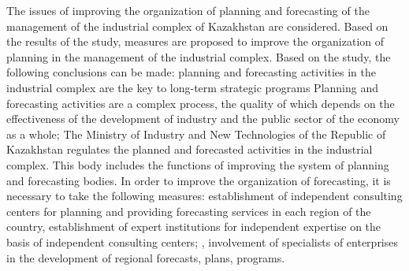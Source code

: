 The issues of improving the organization of planning and forecasting of
the management of the industrial complex of Kazakhstan are considered.
Based on the results of the study, measures are proposed to improve the
organization of planning in the management of the industrial complex.
Based on the study, the following conclusions can be made: planning and
forecasting activities in the industrial complex are the key to
long-term strategic programs Planning and forecasting activities are a
complex process, the quality of which depends on the effectiveness of
the development of industry and the public sector of the economy as a
whole; The Ministry of Industry and New Technologies of the Republic of
Kazakhstan regulates the planned and forecasted activities in the
industrial complex. This body includes the functions of improving the
system of planning and forecasting bodies. In order to improve the
organization of forecasting, it is necessary to take the following
measures: establishment of independent consulting centers for planning
and providing forecasting services in each region of the country,
establishment of expert institutions for independent expertise on the
basis of independent consulting centers; , involvement of specialists of
enterprises in the development of regional forecasts, plans, programs.


